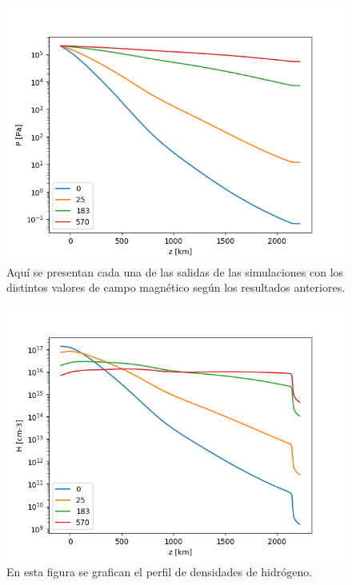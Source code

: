 \documentclass[9pt]{book}
\begin{document}
\begin{figure}[h]
\centering
\includegraphics[scale=1]{am_Presion}
\caption{ Aqu\'i se presentan cada una de las salidas de las simulaciones con los distintos valores de campo magn\'etico seg\'un los resultados anteriores.}
\label{am_Presion}
\end{figure}

\begin{figure}[h]
\centering
\includegraphics[scale=1]{am_perfil_de_densidades}
\caption{ En esta figura se grafican el perfil de densidades de hidr\'ogeno.}
\label{am_perfil_de_densidades}
\end{figure}
\end{document}
